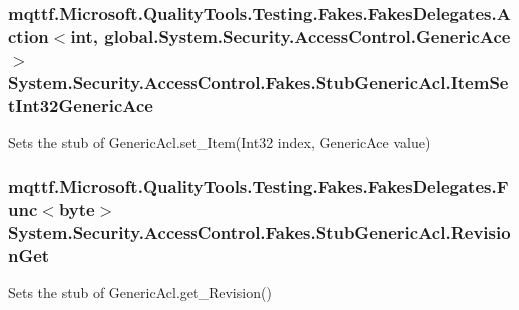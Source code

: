 \hypertarget{class_system_1_1_security_1_1_access_control_1_1_fakes_1_1_stub_generic_acl_a8a1f0f2adbcc65be0fc3436debfb7c8d}{
\subsubsection[{Item\-Set\-Int32\-Generic\-Ace}]{\setlength{\rightskip}{0pt plus 5cm}mqttf.\-Microsoft.\-Quality\-Tools.\-Testing.\-Fakes.\-Fakes\-Delegates.\-Action$<$int, global.\-System.\-Security.\-Access\-Control.\-Generic\-Ace$>$ System.\-Security.\-Access\-Control.\-Fakes.\-Stub\-Generic\-Acl.\-Item\-Set\-Int32\-Generic\-Ace}}\label{class_system_1_1_security_1_1_access_control_1_1_fakes_1_1_stub_generic_acl_a8a1f0f2adbcc65be0fc3436debfb7c8d}


Sets the stub of Generic\-Acl.\-set\-\_\-\-Item(\-Int32 index, Generic\-Ace value)

\hypertarget{class_system_1_1_security_1_1_access_control_1_1_fakes_1_1_stub_generic_acl_a4bfd5d31e18ac4aecc70cbeb256b1928}{
\subsubsection[{Revision\-Get}]{\setlength{\rightskip}{0pt plus 5cm}mqttf.\-Microsoft.\-Quality\-Tools.\-Testing.\-Fakes.\-Fakes\-Delegates.\-Func$<$byte$>$ System.\-Security.\-Access\-Control.\-Fakes.\-Stub\-Generic\-Acl.\-Revision\-Get}}\label{class_system_1_1_security_1_1_access_control_1_1_fakes_1_1_stub_generic_acl_a4bfd5d31e18ac4aecc70cbeb256b1928}


Sets the stub of Generic\-Acl.\-get\-\_\-\-Revision()

